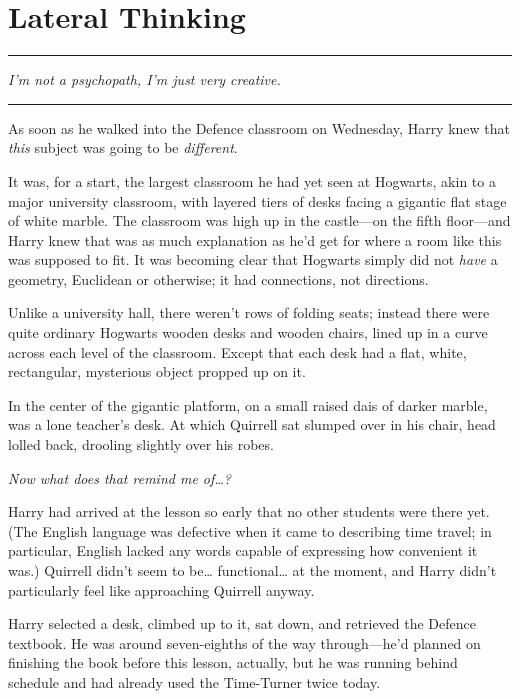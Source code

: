 \chapter{Lateral Thinking}\label{lateral-thinking}

\begin{center}\rule{3in}{0.4pt}\end{center}

\emph{I'm not a psychopath, I'm just very creative.}

\begin{center}\rule{3in}{0.4pt}\end{center}

As soon as he walked into the Defence classroom on Wednesday, Harry knew
that \emph{this} subject was going to be \emph{different}.

It was, for a start, the largest classroom he had yet seen at Hogwarts,
akin to a major university classroom, with layered tiers of desks facing
a gigantic flat stage of white marble. The classroom was high up in the
castle---on the fifth floor---and Harry knew that was as much
explanation as he'd get for where a room like this was supposed to fit.
It was becoming clear that Hogwarts simply did not \emph{have} a
geometry, Euclidean or otherwise; it had connections, not directions.

Unlike a university hall, there weren't rows of folding seats; instead
there were quite ordinary Hogwarts wooden desks and wooden chairs, lined
up in a curve across each level of the classroom. Except that each desk
had a flat, white, rectangular, mysterious object propped up on it.

In the center of the gigantic platform, on a small raised dais of darker
marble, was a lone teacher's desk. At which Quirrell sat slumped over in
his chair, head lolled back, drooling slightly over his robes.

\emph{Now what does that remind me of\ldots{}?}

Harry had arrived at the lesson so early that no other students were
there yet. (The English language was defective when it came to
describing time travel; in particular, English lacked any words capable
of expressing how convenient it was.) Quirrell didn't seem to be\ldots{}
functional\ldots{} at the moment, and Harry didn't particularly feel
like approaching Quirrell anyway.

Harry selected a desk, climbed up to it, sat down, and retrieved the
Defence textbook. He was around seven-eighths of the way through---he'd
planned on finishing the book before this lesson, actually, but he was
running behind schedule and had already used the Time-Turner twice
today.


